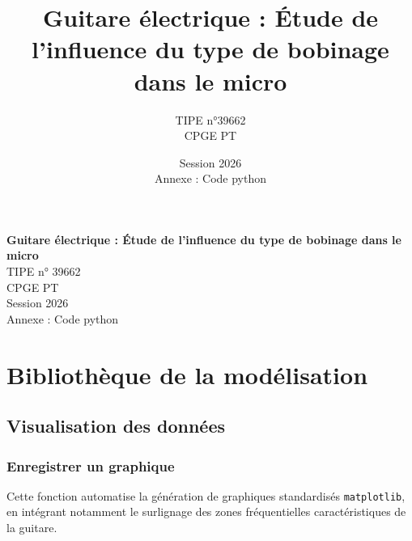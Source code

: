 \documentclass[a4paper,11pt]{article}
\title{\textbf{Guitare électrique : Étude de l'influence du type de bobinage dans le micro}}
\author{TIPE n°39662 \\ CPGE PT}
\date{Session 2026 \\[0.5em] \large Annexe : Code python}
\begin{document}
\begin{titlepage}
    \vspace*{\fill}
    \begin{center}
        {\LARGE \textbf{Guitare électrique : Étude de l'influence du type de bobinage dans le micro}} \\[2cm]
        {\large TIPE n° 39662} \\[0.5cm]
        CPGE PT \\[2cm]
        Session 2026 \\[0.5em] 
        {\large Annexe : Code python}
    \end{center}
    \vspace*{\fill}
\end{titlepage}

\tableofcontents
\newpage

\section{Bibliothèque de la modélisation}

\subsection{Visualisation des données}
\subsubsection{Enregistrer un graphique}
Cette fonction automatise la génération de graphiques standardisés \texttt{matplotlib}, en intégrant notamment le surlignage des zones fréquentielles caractéristiques de la guitare.
\end{document}
